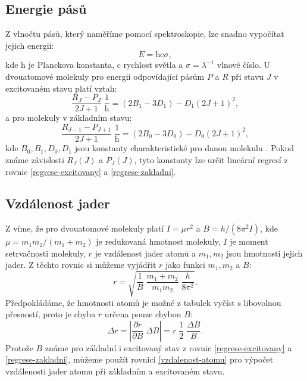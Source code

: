 \documentclass[10pt,a4paper]{article}
\newcommand{\°}{\degree}
\begin{document}
\subsection{Energie pásů}

Z vlnočtu pásů, který naměříme pomocí spektroskopie, lze snadno vypočítat jejich energii:
\begin{equation}
    E = \mathrm{h} \mathrm{c} \sigma,
    \label{energie}
\end{equation}
kde $\mathrm{h}$ je Planckova konstanta, $\mathrm{c}$ rychlost světla a $\sigma = \lambda^{-1}$ vlnové číslo. U dvouatomové molekuly pro energii odpovídající pásům $P$ a $R$ při stavu $J$ v excitovaném stavu platí vztah:
\begin{equation}
    \frac{ R_J  - P_J }{ 2J + 1 } \; \frac{1}{\mathrm{h}}
    =  \left( 2B_1 - 3D_1 \right)  - D_1  \left( 2J+1 \right)^2,
    \label{regrese-excitovany}
\end{equation}
a pro molekuly v základním stavu:
\begin{equation}
    \frac{ R_{J-1}  - P_{J+1} }{ 2J + 1 } \; \frac{1}{\mathrm{h}}
    =  \left( 2B_0 - 3D_0 \right)  - D_0  \left( 2J+1 \right)^2,
    \label{regrese-zakladni}
\end{equation}
kde $B_0, B_1, D_0, D_1$ jsou konstanty charakteristické pro danou molekulu \cite{studijni-text}. Pokud známe závislosti $R_J(J)$ a $P_J(J)$, tyto konstanty lze určit lineární regresí z rovnic \eqref{regrese-excitovany} a \eqref{regrese-zakladni}.

\subsection{Vzdálenost jader}

Z \cite{studijni-text} víme, že pro dvouatomové molekuly platí $I=\mu r^2$ a $B=h / \left( 8 \pi^2 I \right)$, kde $\mu = m_1 m_2 / \left( m_1 + m_2 \right)$ je redukovaná hmotnost molekuly, $I$ je moment setrvačnosti molekuly, $r$ je vzdálenost jader atomů a $m_1, m_2$ jsou hmotnosti jejich jader. Z těchto rovnic si můžeme vyjádřit $r$ jako funkci $m_1, m_2$ a $B$:
\begin{equation}
    r = \sqrt{ \frac{1}{B} \; \frac{m_1 + m_2}{m_1 m_2} \; \frac{h}{8\pi^2} }.
    \label{vzdalenost-atomu}
\end{equation}
Předpokládáme, že hmotnosti atomů je možné z tabulek vyčíst s libovolnou přesností, proto je chyba $r$ určena pouze chybou $B$:
\begin{equation}
    \Delta r = \left| \frac{\partial r}{\partial B} \; \Delta B \right| = r \; \frac{1}{2} \; \frac{\Delta B}{B}.
    \label{vzdalenost-atomu-chyba}
\end{equation}
Protože $B$ známe pro základní i excitovaný stav z rovnic \eqref{regrese-excitovany} a \eqref{regrese-zakladni}, můžeme použít rovnici \eqref{vzdalenost-atomu} pro výpočet vzdálenosti jader atomu při základním a excitovaném stavu.
\end{document}
